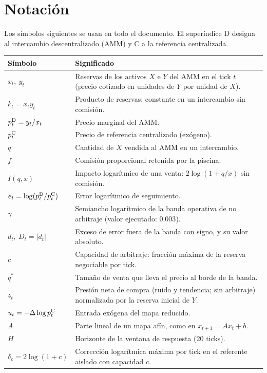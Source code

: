 \chapter*{Notación}

Los símbolos siguientes se usan en todo el documento. El superíndice $\mathrm{D}$ designa al intercambio descentralizado (AMM) y $\mathrm{C}$ a la referencia centralizada.

\begin{center}
\small
\begin{tabularx}{\textwidth}{@{}l X@{}}
\toprule
Símbolo & Significado \\
\midrule
$x_t,\ y_t$ & Reservas de los activos $X$ e $Y$ del AMM en el tick $t$ (precio cotizado en unidades de $Y$ por unidad de $X$). \\
$k_t = x_t y_t$ & Producto de reservas; constante en un intercambio sin comisión. \\
$p^{\mathrm{D}}_t = y_t/x_t$ & Precio marginal del AMM. \\
$p^{\mathrm{C}}_t$ & Precio de referencia centralizado (exógeno). \\
$q$ & Cantidad de $X$ vendida al AMM en un intercambio. \\
$f$ & Comisión proporcional retenida por la piscina. \\
$I(q,x)$ & Impacto logarítmico de una venta: $2\log(1+q/x)$ sin comisión. \\
$e_t = \log(p^{\mathrm{D}}_t/p^{\mathrm{C}}_t)$ & Error logarítmico de seguimiento. \\
$\gamma$ & Semiancho logarítmico de la banda operativa de no arbitraje (valor ejecutado: $0.003$). \\
$d_t,\ D_t = |d_t|$ & Exceso de error fuera de la banda con signo, y su valor absoluto. \\
$c$ & Capacidad de arbitraje: fracción máxima de la reserva negociable por tick. \\
$q^{\ast}$ & Tamaño de venta que lleva el precio al borde de la banda. \\
$z_t$ & Presión neta de compra (ruido y tendencia; sin arbitraje) normalizada por la reserva inicial de $Y$. \\
$u_t = -\Delta\log p^{\mathrm{C}}_t$ & Entrada exógena del mapa reducido. \\
$A$ & Parte lineal de un mapa afín, como en $x_{t+1}=Ax_t+b$. \\
$H$ & Horizonte de la ventana de respuesta (20 ticks). \\
$\delta_c=2\log(1+c)$ & Corrección logarítmica máxima por tick en el referente aislado con capacidad $c$. \\

\end{tabularx}
\end{center}
